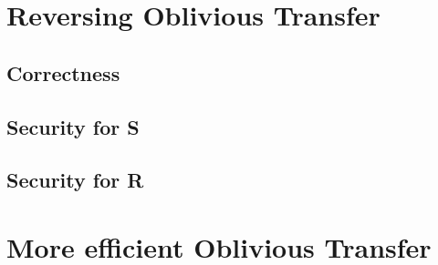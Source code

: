 \documentclass{report}
\begin{document}
	\section{Reversing Oblivious Transfer}
	\startsection
		\subsection{Correctness}
		\startsubsection
		\closesection
		\subsection{Security for S}
		\startsubsection
		\closesection
		\subsection{Security for R}
		\startsubsection
		\closesection
	\closesection
	
	\section{More efficient Oblivious Transfer}
	\startsection
	\closesection
\end{document}
